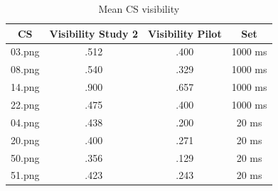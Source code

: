 \documentclass[
  ,doc,11pt, twoside,floatsintext]{apa6}
\begin{document}
\begin{appendix}
\begin{table}[h]
\begin{center}
\begin{threeparttable}
\caption{\label{tab:appendix_table2}Mean CS visibility}
\begin{tabular}{cccc}
\toprule
CS & \multicolumn{1}{c}{Visibility Study 2} & \multicolumn{1}{c}{Visibility Pilot} & \multicolumn{1}{c}{Set}\\
\midrule
03.png & .512 & .400 & 1000 ms\\
08.png & .540 & .329 & 1000 ms\\
14.png & .900 & .657 & 1000 ms\\
22.png & .475 & .400 & 1000 ms\\
04.png & .438 & .200 & 20 ms\\
20.png & .400 & .271 & 20 ms\\
50.png & .356 & .129 & 20 ms\\
51.png & .423 & .243 & 20 ms\\
\bottomrule
\end{tabular}
\end{threeparttable}
\end{center}
\end{table}
\end{appendix}
\end{document}
